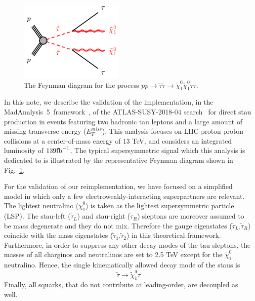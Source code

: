 \documentclass{ws-mpla}
\newcommand{\madanalysis}{{\sc MadAnalysis~5}}
\begin{document}
\begin{figure}[t]
  \centerline{\includegraphics[width=2.0in]{fig_01}}
  \vspace*{8pt}
  \caption{The Feynman diagram for the process $pp\rightarrow\tilde{\tau}\tilde{\tau}\rightarrow\tilde{\chi}^0_1\tilde{\chi}^0_1\tau\tau$.\protect\label{fig:fig_01}}
\end{figure}

In this note, we describe the validation of the implementation, in the \madanalysis\ framework~\cite{Conte:2018vmg,Dumont:2014tja,Conte:2014zja,Conte:2012fm}, of the ATLAS-SUSY-2018-04 search~\cite{Aad:2019byo} for direct stau production in events featuring two hadronic tau leptons and a large amount of missing transverse energy ($E^{miss}_T$).
This analysis focuses on LHC proton-proton collisions at a center-of-mass energy of 13 TeV, and considers an integrated luminosity of $139 {\rm fb}^{-1}$.
The typical supersymmetric signal which this analysis is dedicated to is illustrated by the representative Feynman diagram shown in Fig.~\ref{fig:fig_01}. 

For the validation of our reimplementation, we have focused on a simplified model in which only a few electroweakly-interacting superpartners are relevant.
The lightest neutralino ($\tilde{\chi}^0_1$) is taken as the lightest supersymmetric particle (LSP).
The stau-left ($\tilde{\tau}_L$) and stau-right ($\tilde{\tau}_R$) sleptons are moreover assumed to be mass degenerate and they do not mix. Therefore the gauge eigenstates ($\tilde{\tau}_L$,$\tilde{\tau}_R$) coincide with the mass eigenstates ($\tilde{\tau}_1$,$\tilde{\tau}_2$) in this theoretical framework.
Furthermore, in order to suppress any other decay modes of the tau sleptons, the masses of all charginos and neutralinos are set to 2.5 TeV except for the $\tilde{\chi}^0_1$ neutralino. 
Hence, the single kinematically allowed decay mode of the staus is 
\begin{equation}
\tilde{\tau}\rightarrow\tilde{\chi}^0_1 \tau 
\end{equation}
Finally, all squarks, that do not contribute at leading-order, are decoupled as well.
\end{document}
